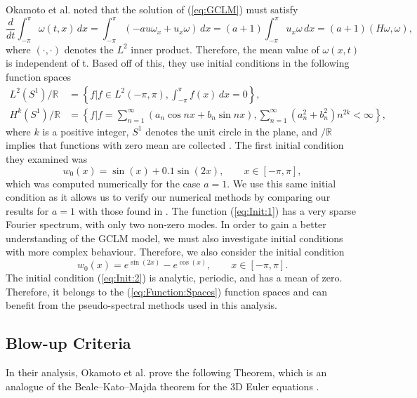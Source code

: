 \documentclass[12pt]{article}
\newcommand{\lb}{\left\lbrace}
\newcommand{\rb}{\right\rbrace}
\def\w{\omega}
\def\R{\mathbb{R}}
\numberwithin{equation}{section}
\begin{document}
Okamoto et al. noted that the solution of (\ref{eq:GCLM}) must satisfy
\begin{equation}
\frac{d}{dt}\int_{-\pi}^{\pi}\omega(t,x)\,dx = \int_{-\pi}^{\pi} (-au\omega_x + u_x\omega)\,dx = (a+1)\int_{-\pi}^{\pi}u_x\omega\,dx = (a+1)(H\omega,\omega),
\end{equation}
where  $(\cdot,\cdot)$ denotes the $L^2$ inner product. Therefore, the mean value of $\w(x,t)$ is independent of t. Based off of this, they use initial conditions in the following function spaces
\begin{subequations}\label{eq:Function:Spaces}
\begin{align}
L^2(S^1)/\R &= \lb f \big| f\in L^2(-\pi,\pi), \int_{-\pi}^{\pi}f(x)\,dx = 0\rb,\\
H^k(S^1)/\R &= \lb f \big| f=\sum_{n=1}^\infty(a_n\cos nx + b_n \sin nx),\sum_{n=1}^\infty (a_n^2 + b_n^2)n^{2k} < \infty \rb,
\end{align}
\end{subequations}
where $k$ is a positive integer, $S^1$ denotes the unit circle in the plane, and $/\R$ implies that functions with zero mean are collected \cite{okamoto_generalization_2008}. The first initial condition they examined was
\begin{equation}\label{eq:Init:1}
w_{0}(x) = \sin(x)+0.1\sin(2x), \qquad x\in[-\pi, \pi], 
\end{equation}
which was computed numerically for the case $a=1$. We use this same initial condition as it allows us to verify our numerical methods by comparing our results for $a=1$ with those found in \cite{okamoto_generalization_2008}. The function (\ref{eq:Init:1}) has a very sparse Fourier spectrum, with only two non-zero modes. In order to gain a better understanding of the GCLM model, we must also investigate initial conditions with more complex behaviour. Therefore, we also consider the initial condition
\begin{equation}\label{eq:Init:2}
w_{0}(x) = e^{\sin(2x)} - e^{\cos(x)}, \qquad x\in[-\pi,\pi].
\end{equation}
The initial condition (\ref{eq:Init:2}) is analytic, periodic, and has a mean of zero. Therefore, it belongs to the (\ref{eq:Function:Spaces}) function spaces and can benefit from the pseudo-spectral methods used in this analysis.

\subsection{Blow-up Criteria}
In their analysis, Okamoto et al. prove the following Theorem, which is an analogue of the Beale–Kato–Majda theorem for the 3D Euler equations \cite{okamoto_generalization_2008}\cite{beale_remarks_1984}.
\end{document}
